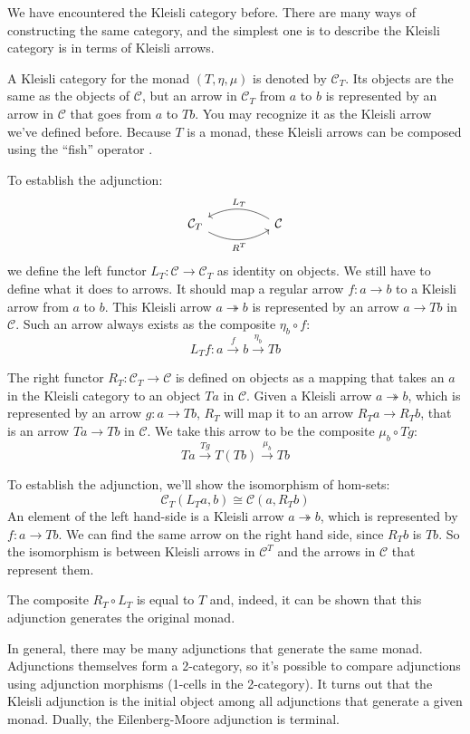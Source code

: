 \documentclass[DaoFP]{subfiles}
\begin{document}
We have encountered the Kleisli category before. There are many ways of constructing the same category, and the simplest one is to describe the Kleisli category is in terms of Kleisli arrows. 

A Kleisli category for the monad $(T, \eta, \mu)$ is denoted by $\mathcal{C}_T$. Its objects are the same as the objects of $\mathcal{C}$, but an arrow in $\mathcal{C}_T$ from $a$ to $b$ is represented by an arrow in $\mathcal{C}$ that goes from $a$ to $T b$. You may recognize it as the Kleisli arrow  we've defined before. Because $T$ is a monad, these Kleisli arrows can be composed using the ``fish'' operator \hask{<=<}. 

To establish the adjunction:
\[
 \begin{tikzcd}
   \mathcal{C}_T
    \arrow[rr, bend right, "R^T"']
&&
  \mathcal{C}
  \arrow[ll, bend right, "L_T"']
 \end{tikzcd}
\]
we define the left functor $L_T \colon \mathcal{C} \to \mathcal{C}_T$ as identity on objects. We still have to define what it does to arrows. It should map a regular arrow $f \colon a \to b$ to a Kleisli arrow from $a$ to $b$. This Kleisli arrow $a \twoheadrightarrow b$ is represented by an arrow $a \to T b$ in $\mathcal{C}$. Such an arrow always exists as the composite $\eta_b \circ f$:
\[ L_T f \colon a \xrightarrow{f} b \xrightarrow{\eta_b} T b\]

The right functor $R_T \colon \mathcal{C}_T \to \mathcal{C}$ is defined on objects as a mapping that takes an $a$ in the Kleisli category to an object $T a$ in $\mathcal{C}$. Given a Kleisli arrow $a \twoheadrightarrow b$, which is represented by an arrow $g \colon a \to T b$, $R_T$ will map it to an arrow $R_T a \to R_T b$, that is an arrow $T a \to T b$ in $\mathcal{C}$. We take this arrow to be the composite $\mu_b \circ T g$:
\[  T a \xrightarrow{T g} T(T b) \xrightarrow{\mu_b} T b\]

To establish the adjunction, we'll show the isomorphism of hom-sets:
\[\mathcal{C}_T(L_T a, b) \cong \mathcal{C}(a, R_T b)\]
An element of the left hand-side is a Kleisli arrow $a \twoheadrightarrow b$, which is represented by $f \colon a \to T b$. We can find the same arrow on the right hand side, since $R_T b$ is $T b$. So the isomorphism is between Kleisli arrows in $\mathcal{C}^T$ and the arrows in $\mathcal{C}$ that represent them.

The composite $R_T \circ L_T$ is equal to $T$ and, indeed, it can be shown that this adjunction generates the original monad. 

In general, there may be many adjunctions that generate the same monad. Adjunctions themselves form a 2-category, so it's possible to compare adjunctions using adjunction morphisms (1-cells in the 2-category). It turns out that the Kleisli adjunction is the initial object among all adjunctions that generate a given monad. Dually, the Eilenberg-Moore adjunction is terminal. 
\end{document}
